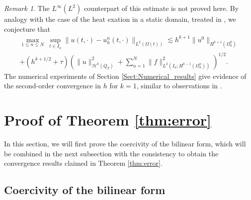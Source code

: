 \documentclass[11pt,a4paper]{article}
\theoremstyle{plain}
\theoremstyle{definition}
\theoremstyle{remark}
\newtheorem{remark}{Remark}%
\numberwithin{equation}{section}
\begin{document}
\begin{remark}
The $L^{\infty}(L^2)$ counterpart of this estimate is not proved here. By analogy with the case of the heat exation in a static domain, treated in \cite{heat}, we conjecture that 
\begin{multline*} \max_{1 \leqslant n \leqslant N} \ \sup_{t \in I_n} \|u(t,\cdot) - u_h^n(t,\cdot)\|_{L^2(\Omega(t))}
\lesssim h^{k+1}\|u^0\|_{H^{k+1}(\Omega_h^0)} \\
+ (h^{k+{1/2}} + \tau) \left( \|u\|^2_{\mathcal{H}^k(Q_T)} + \sum_{n=1}^N \|f\|_{L^2(I_n;H^{k-1}(\Omega_h^n))}^2 \right)^{1/2}.
\end{multline*}
The numerical experiments of Section \ref{Sect:Numerical_results} give evidence of the second-order convergence in $h$ for $k=1$, similar to observations in \cite{heat}.
\end{remark}


\section{Proof of Theorem \ref{thm:error}}\label{Sect:Proof}

In this section, we will first prove the coercivity of the bilinear form, which will be combined in the next subsection with the consistency to obtain the convergence results claimed in Theorem \ref{thm:error}.

\subsection{Coercivity of the bilinear form}
\end{document}
